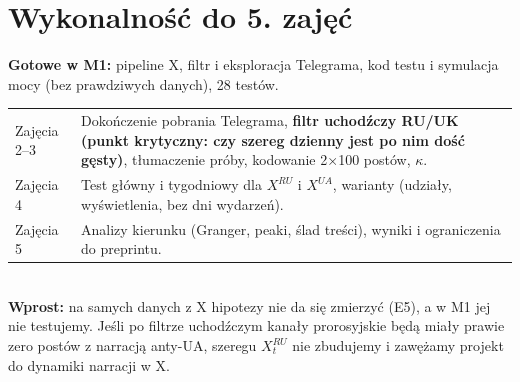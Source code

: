 \documentclass[10pt,a4paper]{article}
\begin{document}
\section{Wykonalność do 5. zajęć}
\textbf{Gotowe w M1:} pipeline X, filtr i eksploracja Telegrama, kod testu i symulacja mocy (bez prawdziwych danych), 28 testów.\\[1pt]
\begin{tabularx}{\linewidth}{@{}lX@{}}
\toprule
Zajęcia 2--3 & Dokończenie pobrania Telegrama, \textbf{filtr uchodźczy RU/UK (punkt krytyczny: czy szereg dzienny jest po nim dość gęsty)}, tłumaczenie próby, kodowanie 2×100 postów, $\kappa$. \\
Zajęcia 4 & Test główny i tygodniowy dla $X^{RU}$ i $X^{UA}$, warianty (udziały, wyświetlenia, bez dni wydarzeń). \\
Zajęcia 5 & Analizy kierunku (Granger, peaki, ślad treści), wyniki i ograniczenia do preprintu. \\
\bottomrule
\end{tabularx}\\[2pt]
\textbf{Wprost:} na samych danych z X hipotezy nie da się zmierzyć (E5), a w M1 jej nie testujemy. Jeśli po filtrze uchodźczym kanały prorosyjskie będą miały prawie zero postów
z narracją anty-UA, szeregu $X^{RU}_t$ nie zbudujemy i zawężamy projekt do dynamiki narracji w X.
\end{document}
